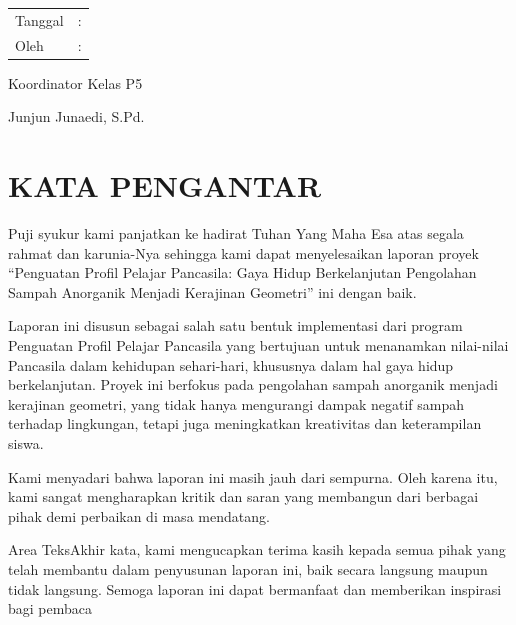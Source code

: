 \documentclass[a4paper,12pt]{article}
\begin{document}
\begin{table}[ht]
    \begin{tabular}{ll}
        Tanggal &: \\
        Oleh&: \\
    \end{tabular}
\end{table}
\vspace{5cm}
Koordinator Kelas P5\\
\newline

\vspace{5cm}
Junjun Junaedi, S.Pd.\\
\pagebreak

    \section*{KATA PENGANTAR}

Puji syukur kami panjatkan ke hadirat Tuhan Yang Maha Esa atas segala rahmat dan karunia-Nya sehingga kami dapat menyelesaikan laporan proyek “Penguatan Profil Pelajar Pancasila: Gaya Hidup Berkelanjutan Pengolahan Sampah Anorganik Menjadi Kerajinan Geometri” ini dengan baik. 

Laporan ini disusun sebagai salah satu bentuk implementasi dari program Penguatan Profil Pelajar Pancasila yang bertujuan untuk menanamkan nilai-nilai Pancasila dalam kehidupan sehari-hari, khususnya dalam hal gaya hidup berkelanjutan. Proyek ini berfokus pada pengolahan sampah anorganik menjadi kerajinan geometri, yang tidak hanya mengurangi dampak negatif sampah terhadap lingkungan, tetapi juga meningkatkan kreativitas dan keterampilan siswa. 

Kami menyadari bahwa laporan ini masih jauh dari sempurna. Oleh karena itu, kami sangat mengharapkan kritik dan saran yang membangun dari berbagai pihak demi perbaikan di masa mendatang. 

Area TeksAkhir kata, kami mengucapkan terima kasih kepada semua pihak yang telah membantu dalam penyusunan laporan ini, baik secara langsung maupun tidak langsung. Semoga laporan ini dapat bermanfaat dan memberikan inspirasi bagi pembaca\\

    \vspace{3cm}
\pagebreak
\end{document}
